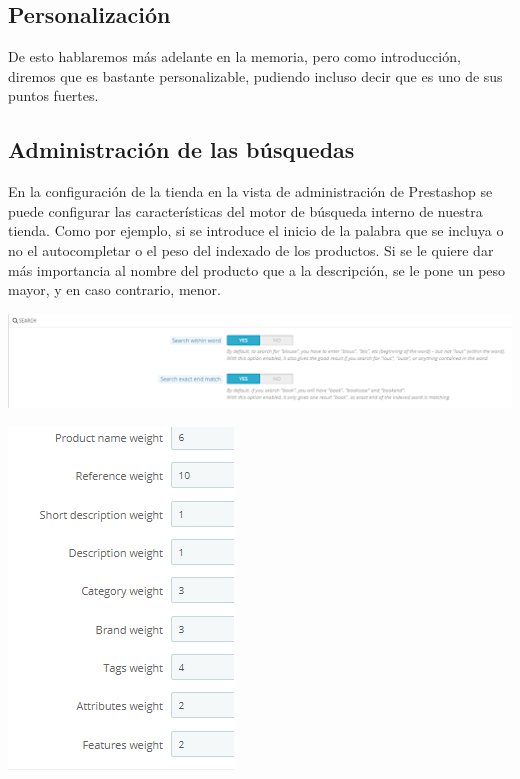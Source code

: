 \documentclass{article}
\begin{document}
\subsection{Personalización}

De esto hablaremos más adelante en la memoria, pero como introducción, diremos que es bastante personalizable, pudiendo incluso decir que es uno de sus puntos fuertes.

\subsection{Administración de las búsquedas}

En la configuración de la tienda en la vista de administración de Prestashop se puede configurar las características del motor de búsqueda interno de nuestra tienda. Como por ejemplo, si se introduce el inicio de la palabra que se incluya o no el autocompletar o el peso del indexado de los productos. Si se le quiere dar más importancia al nombre del producto que a la descripción, se le pone un peso mayor, y en caso contrario, menor.

\begin{center}
\includegraphics[scale=0.4]{images/search.png}
\end{center}
\begin{center}
\includegraphics[scale=0.4]{images/weight.png}
\end{center}
\end{document}
